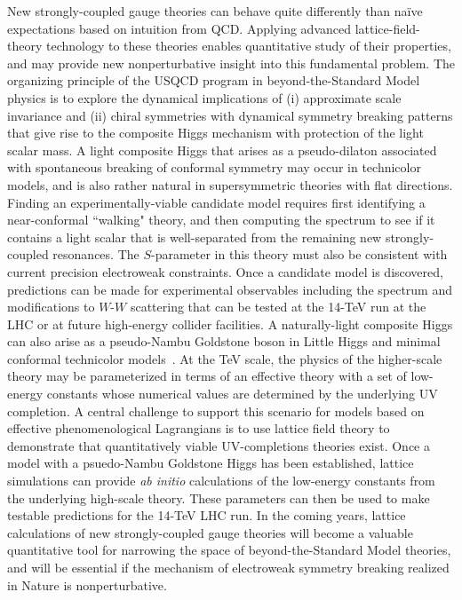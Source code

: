 \begin{itemize}
New strongly-coupled gauge theories can behave quite differently than na{\"i}ve expectations based on intuition from QCD.  Applying advanced lattice-field-theory technology to these theories enables quantitative study of their properties, and may provide new nonperturbative insight into this fundamental problem.  The organizing principle of the USQCD program in beyond-the-Standard Model physics is to explore the dynamical implications of (i) approximate scale invariance and (ii) chiral symmetries with dynamical symmetry breaking patterns that give rise to the composite Higgs mechanism with protection of the light scalar mass.  A light composite Higgs that arises as a pseudo-dilaton associated with spontaneous breaking of conformal symmetry may occur in technicolor models, and is also rather natural in supersymmetric theories with flat directions.  Finding an experimentally-viable candidate model requires first identifying a near-conformal ``walking" theory, and then computing the spectrum to see if it contains a light scalar that is well-separated from the remaining new strongly-coupled resonances.   The $S$-parameter in this theory must also be consistent with current precision electroweak constraints.  Once a candidate model is discovered, predictions can be made for experimental observables including the spectrum and modifications to $W$-$W$ scattering that can be tested at the 14-TeV run at the LHC or at future high-energy collider facilities.  A naturally-light composite Higgs can also arise as a pseudo-Nambu Goldstone boson in Little Higgs and minimal conformal technicolor models~\cite{ArkaniHamed:2002qy,Galloway:2010bp}.  At the TeV scale, the physics of the higher-scale theory may be parameterized in terms of an effective theory with a set of low-energy constants whose numerical values are determined by the underlying UV completion.   A central challenge to support this scenario for models based on effective phenomenological Lagrangians is to use lattice field theory to demonstrate that quantitatively viable UV-completions theories exist.  Once a model with a psuedo-Nambu Goldstone Higgs has been established, lattice simulations can provide {\it ab initio} calculations of the low-energy constants from the underlying high-scale theory.  These parameters can then be used to make testable predictions for the 14-TeV LHC run.  In the coming years, lattice calculations of new strongly-coupled gauge theories will become a valuable quantitative tool for narrowing the space of beyond-the-Standard Model theories, and will be essential if the mechanism of electroweak symmetry breaking realized in Nature is nonperturbative.


\end{itemize}
